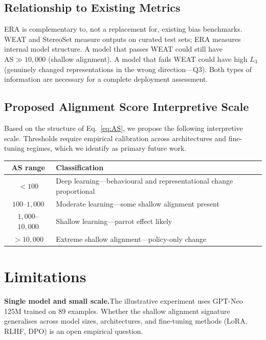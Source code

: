 \documentclass[11pt,a4paper]{article}
\newcommand{\AS}{\mathrm{AS}}
\begin{document}
\subsection{Relationship to Existing Metrics}

ERA is complementary to, not a replacement for, existing bias benchmarks. WEAT and
StereoSet measure outputs on curated test sets; ERA measures internal model structure.
A model that passes WEAT could still have $\AS \gg 10{,}000$ (shallow alignment). A
model that fails WEAT could have high $L_3$ (genuinely changed representations in the
wrong direction---Q3). Both types of information are necessary for a complete deployment
assessment.

\subsection{Proposed Alignment Score Interpretive Scale}

Based on the structure of Eq.~\eqref{eq:AS}, we propose the following interpretive
scale. Thresholds require empirical calibration across architectures and fine-tuning
regimes, which we identify as primary future work.

\begin{table}[ht]
\centering
\setlength{\tabcolsep}{8pt}
\renewcommand{\arraystretch}{1.25}
\begin{tabular}{@{}cl@{}}
\toprule
\textbf{AS range} & \textbf{Classification} \\
\midrule
$< 100$           & Deep learning---behavioural and representational change proportional \\
$100$--$1{,}000$  & Moderate learning---some shallow alignment present \\
$1{,}000$--$10{,}000$ & Shallow learning---parrot effect likely \\
$> 10{,}000$      & Extreme shallow alignment---policy-only change \\
\bottomrule
\end{tabular}
\end{table}

\section{Limitations}

\textbf{Single model and small scale.}\enspace The illustrative experiment uses GPT-Neo
125M trained on 89 examples. Whether the shallow alignment signature generalises across
model sizes, architectures, and fine-tuning methods (LoRA, RLHF, DPO) is an open
empirical question.
\end{document}
